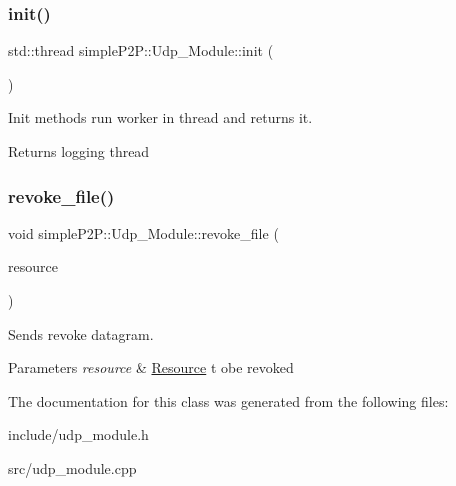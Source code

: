 \subsubsection{\texorpdfstring{init()}{init()}}
{\footnotesize\ttfamily std\+::thread simple\+P2\+P\+::\+Udp\+\_\+\+Module\+::init (\begin{DoxyParamCaption}{ }\end{DoxyParamCaption})}



Init methods run worker in thread and returns it. 

\begin{DoxyReturn}{Returns}
logging thread 
\end{DoxyReturn}
\mbox{\label{classsimpleP2P_1_1Udp__Module_ad3904b2be4e113a8f7be11b23cfde4d2}} 
\subsubsection{\texorpdfstring{revoke\+\_\+file()}{revoke\_file()}}
{\footnotesize\ttfamily void simple\+P2\+P\+::\+Udp\+\_\+\+Module\+::revoke\+\_\+file (\begin{DoxyParamCaption}\item[{const \hyperlink{classsimpleP2P_1_1Resource}{Resource} \&}]{resource }\end{DoxyParamCaption})}



Sends revoke datagram. 


\begin{DoxyParams}{Parameters}
{\em resource} & \hyperlink{classsimpleP2P_1_1Resource}{Resource} t obe revoked \\
\hline
\end{DoxyParams}


The documentation for this class was generated from the following files\+:\begin{DoxyCompactItemize}
\item 
include/udp\+\_\+module.\+h\item 
src/udp\+\_\+module.\+cpp\end{DoxyCompactItemize}
